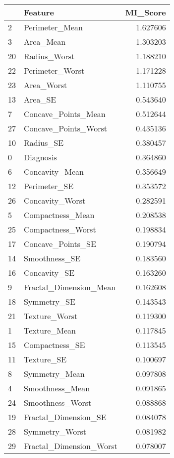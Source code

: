 \begin{tabular}{llr}
\toprule
 & Feature & MI_Score \\
\midrule
2 & Perimeter_Mean & 1.627606 \\
3 & Area_Mean & 1.303203 \\
20 & Radius_Worst & 1.188210 \\
22 & Perimeter_Worst & 1.171228 \\
23 & Area_Worst & 1.110755 \\
13 & Area_SE & 0.543640 \\
7 & Concave_Points_Mean & 0.512644 \\
27 & Concave_Points_Worst & 0.435136 \\
10 & Radius_SE & 0.380457 \\
0 & Diagnosis & 0.364860 \\
6 & Concavity_Mean & 0.356649 \\
12 & Perimeter_SE & 0.353572 \\
26 & Concavity_Worst & 0.282591 \\
5 & Compactness_Mean & 0.208538 \\
25 & Compactness_Worst & 0.198834 \\
17 & Concave_Points_SE & 0.190794 \\
14 & Smoothness_SE & 0.183560 \\
16 & Concavity_SE & 0.163260 \\
9 & Fractal_Dimension_Mean & 0.162608 \\
18 & Symmetry_SE & 0.143543 \\
21 & Texture_Worst & 0.119300 \\
1 & Texture_Mean & 0.117845 \\
15 & Compactness_SE & 0.113545 \\
11 & Texture_SE & 0.100697 \\
8 & Symmetry_Mean & 0.097808 \\
4 & Smoothness_Mean & 0.091865 \\
24 & Smoothness_Worst & 0.088868 \\
19 & Fractal_Dimension_SE & 0.084078 \\
28 & Symmetry_Worst & 0.081982 \\
29 & Fractal_Dimension_Worst & 0.078007 \\
\bottomrule
\end{tabular}

